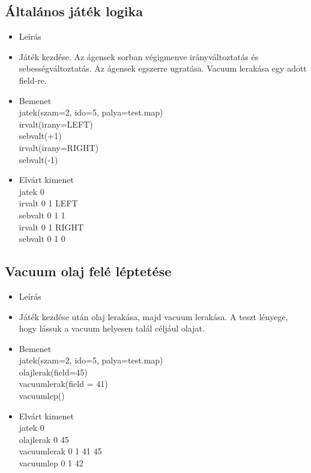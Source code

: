 \subsection{Általános játék logika}
\begin{itemize}
	\item Leírás\\
	\item Játék kezdése. Az ágensek sorban végigmenve irányváltoztatás és sebességváltoztatás. Az ágensek egszerre ugratása. Vacuum lerakása egy adott field-re.
	\item Bemenet\\
		jatek(szam=2, ido=5, palya=test.map) \\
		irvalt(irany=LEFT) \\
		sebvalt(+1) \\
		irvalt(irany=RIGHT) \\
		sebvalt(-1) \\
	\item Elvárt kimenet\\
		jatek 0 \\ 
		irvalt 0 1 LEFT \\ 
		sebvalt 0 1 1 \\ 
		irvalt 0 1 RIGHT \\ 
		sebvalt 0 1 0	\\ 
\end{itemize}

\subsection{Vacuum olaj felé léptetése}
\begin{itemize}
	\item Leírás\\
	\item Játék kezdése után olaj lerakása, majd vacuum lerakása. A teszt lényege, hogy lássuk a vacuum helyesen talál céljául olajat.
	\item Bemenet\\
		jatek(szam=2, ido=5, palya=test.map) \\
		olajlerak(field=45) \\
		vacuumlerak(field = 41) \\
		vacuumlep() \\
	\item Elvárt kimenet\\
		jatek 0 \\
		olajlerak 0 45 \\
		vacuumlerak 0 1 41 45 \\
		vacuumlep 0 1 42 \\ 
\end{itemize}

